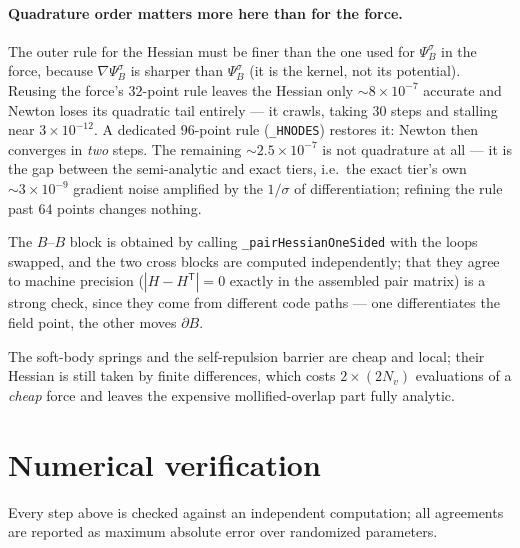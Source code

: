 \documentclass[11pt]{article}
\numberwithin{equation}{section}
\begin{document}
\paragraph{Quadrature order matters more here than for the force.} The outer rule for the Hessian must
be finer than the one used for $\Psi_B^\sigma$ in the force, because $\nabla\Psi_B^\sigma$ is sharper
than $\Psi_B^\sigma$ (it is the kernel, not its potential). Reusing the force's $32$-point rule leaves
the Hessian only $\sim8\times10^{-7}$ accurate and Newton loses its quadratic tail entirely --- it
crawls, taking $30$ steps and stalling near $3\times10^{-12}$. A dedicated $96$-point rule
(\texttt{\_HNODES}) restores it: Newton then converges in \emph{two} steps. The remaining
$\sim2.5\times10^{-7}$ is not quadrature at all --- it is the gap between the semi-analytic and exact
tiers, i.e.\ the exact tier's own $\sim3\times10^{-9}$ gradient noise amplified by the $1/\sigma$ of
differentiation; refining the rule past $64$ points changes nothing.

\noindent The $B$--$B$ block is obtained by calling \texttt{\_pairHessianOneSided} with the loops
swapped, and the two cross blocks are computed independently; that they agree to machine precision
($|H-H^{\mathsf T}|=0$ exactly in the assembled pair matrix) is a strong check, since they come from
different code paths --- one differentiates the field point, the other moves $\partial B$.

The soft-body springs and the self-repulsion barrier are cheap and local; their Hessian is still taken
by finite differences, which costs $2\times(2N_v)$ evaluations of a \emph{cheap} force and leaves the
expensive mollified-overlap part fully analytic.

\section{Numerical verification}\label{sec:verify}

Every step above is checked against an independent computation; all agreements are reported as maximum
absolute error over randomized parameters.
\end{document}
